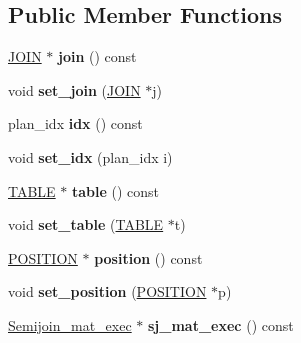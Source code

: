 \subsection*{Public Member Functions}
\begin{DoxyCompactItemize}
\item 
\mbox{\label{classQEP__shared_aa75e5d1e772587d864c39cc9d3bf3362}} 
\mbox{\hyperlink{classJOIN}{J\+O\+IN}} $\ast$ {\bfseries join} () const
\item 
\mbox{\label{classQEP__shared_a0c1196952191490212a7cb04d34385ef}} 
void {\bfseries set\+\_\+join} (\mbox{\hyperlink{classJOIN}{J\+O\+IN}} $\ast$j)
\item 
\mbox{\label{classQEP__shared_abd64ef5d2652cc30c413181d7254d2e6}} 
plan\+\_\+idx {\bfseries idx} () const
\item 
\mbox{\label{classQEP__shared_ad77b9f4e3eea7eafb7adbc995ff3f41b}} 
void {\bfseries set\+\_\+idx} (plan\+\_\+idx i)
\item 
\mbox{\label{classQEP__shared_a26e0514a23e413493871f2a7c19fd9a9}} 
\mbox{\hyperlink{structTABLE}{T\+A\+B\+LE}} $\ast$ {\bfseries table} () const
\item 
\mbox{\label{classQEP__shared_ae6a1cb066e007d87a407d7ace06acdce}} 
void {\bfseries set\+\_\+table} (\mbox{\hyperlink{structTABLE}{T\+A\+B\+LE}} $\ast$t)
\item 
\mbox{\label{classQEP__shared_ad9a3e10cd1b15fdd5fc328d5625f399c}} 
\mbox{\hyperlink{structst__position}{P\+O\+S\+I\+T\+I\+ON}} $\ast$ {\bfseries position} () const
\item 
\mbox{\label{classQEP__shared_a39f1736d74be50a482c1050bc9e55ea3}} 
void {\bfseries set\+\_\+position} (\mbox{\hyperlink{structst__position}{P\+O\+S\+I\+T\+I\+ON}} $\ast$p)
\item 
\mbox{\label{classQEP__shared_a7213dcbdf5fea419ba74b6123c8df46d}} 
\mbox{\hyperlink{classSemijoin__mat__exec}{Semijoin\+\_\+mat\+\_\+exec}} $\ast$ {\bfseries sj\+\_\+mat\+\_\+exec} () const
\item 

\end{DoxyCompactItemize}
